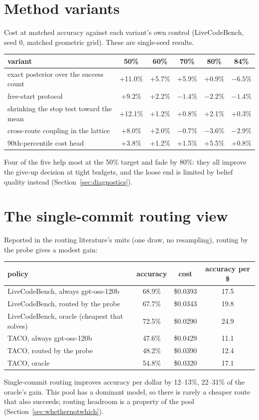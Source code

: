 \documentclass[10pt]{article} %
\begin{document}
\section{Method variants}
\label{app:variants}

Cost at matched accuracy against each variant's own control (LiveCodeBench, seed 0, matched
geometric grid).  These are single-seed results.

\begin{center}
\small
\begin{tabular}{lccccc}
\toprule
variant & 50\% & 60\% & 70\% & 80\% & 84\% \\
\midrule
exact posterior over the success count & +11.0\% & +5.7\% & +5.9\% & +0.9\% & $-6.5$\% \\
free-start protocol & +9.2\% & +2.2\% & $-1.4$\% & $-2.2$\% & $-1.4$\% \\
shrinking the stop test toward the mean & +12.1\% & +1.2\% & +0.8\% & +2.1\% & +0.3\% \\
cross-route coupling in the lattice & +8.0\% & +2.0\% & $-0.7$\% & $-3.6$\% & $-2.9$\% \\
90th-percentile cost head & +3.8\% & +1.2\% & +1.5\% & +5.5\% & +0.8\% \\
\bottomrule
\end{tabular}
\end{center}
Four of the five help most at the 50\% target and fade by 80\%: they all improve the give-up
decision at tight budgets, and the loose end is limited by belief quality instead
(Section~\ref{sec:diagnostics}).

\section{The single-commit routing view}
\label{app:singleshot}

Reported in the routing literature's units (one draw, no resampling), routing by the probe gives
a modest gain:

\begin{center}
\small
\begin{tabular}{lccc}
\toprule
policy & accuracy & cost & accuracy per \$ \\
\midrule
LiveCodeBench, always gpt-oss-120b & 68.9\% & \$0.0393 & 17.5 \\
LiveCodeBench, routed by the probe & 67.7\% & \$0.0343 & 19.8 \\
LiveCodeBench, oracle (cheapest that solves) & 72.5\% & \$0.0290 & 24.9 \\
TACO, always gpt-oss-120b & 47.6\% & \$0.0429 & 11.1 \\
TACO, routed by the probe & 48.2\% & \$0.0390 & 12.4 \\
TACO, oracle & 54.8\% & \$0.0320 & 17.1 \\
\bottomrule
\end{tabular}
\end{center}
Single-commit routing improves accuracy per dollar by 12--13\%, 22--31\% of the oracle's gain.
This pool has a dominant model, so there is rarely a cheaper route that also succeeds; routing
headroom is a property of the pool (Section~\ref{sec:whethernotwhich}).
\end{document}

